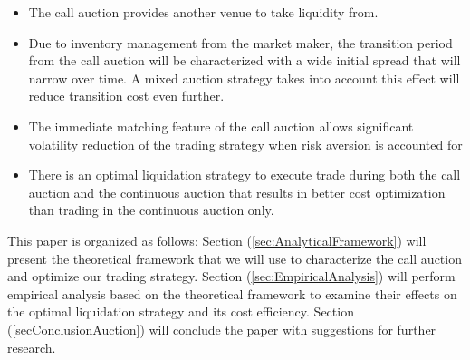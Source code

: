 \begin{itemize}
  \item The call auction provides another venue to take liquidity from.
  \item Due to inventory management from the market maker, the transition period from the call auction will be characterized with a wide initial spread that will narrow over time. A mixed auction strategy takes into account this effect will reduce transition cost even further.
  \item {\color{red} The immediate matching feature of the call auction allows significant volatility reduction of the trading strategy when risk aversion is accounted for}
  \item There is an optimal liquidation strategy to execute trade during both the call auction and the continuous auction that results in better cost optimization than trading in the continuous auction only.
\end{itemize}

This paper is organized as follows: Section (\ref{sec:AnalyticalFramework}) will present the theoretical framework that we will use to characterize the call auction and optimize our trading strategy. Section (\ref{sec:EmpiricalAnalysis}) will perform empirical analysis based on the theoretical framework to examine their effects on the optimal liquidation strategy and its cost efficiency. Section (\ref{secConclusionAuction}) will conclude the paper with suggestions for further research.